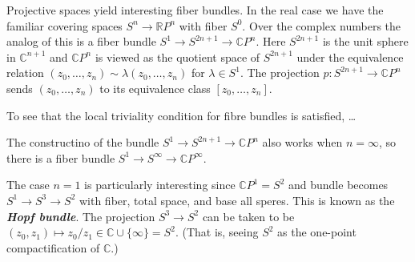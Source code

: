 \documentclass{article}
\newcommand{\C}{\mathbb{C}}
\newcommand{\R}{\mathbb{R}}
\begin{document}
\begin{example}
	Projective spaces yield interesting fiber bundles. In the real case we have the familiar covering spaces $S^n\to\R P^n$ with fiber $S^0$. Over the complex numbers the analog of this is a fiber bundle $S^1\to S^{2n+1}\to\C P^n$. Here $S^{2n+1}$ is the unit sphere in $\C^{n+1}$ and $\C P^n$ is viewed as the quotient space of $S^{2n+1}$ under the equivalence relation $(z_0,\ldots,z_n)\sim\lambda(z_0,\ldots,z_n)$ {\color{orange}for $\lambda\in S^1$}. The projection $p:S^{2n+1}\to\C P^n$ sends $(z_0,\ldots,z_n)$ to its equivalence class $[z_0,\ldots,z_n]$.
	
	To see that the local triviality condition for fibre bundles is satisfied, …
	
	The constructino of the bundle $S^1\to S^{2n+1}\to\C P^n$ also works when $n=\infty$, so there is a fiber bundle $S^1\to S^\infty\to \C P^\infty$.
	
	The case $n=1$ is particularly interesting since $\C P^1=S^2$ and bundle becomes $S^1\to S^3\to S^2$ with fiber, total space, and base all speres. This is known as the \textbf{\textit{Hopf bundle}}. The projection $S^3\to S^2$ can be taken to be $(z_0,z_1)\mapsto z_0/z_1\in\C\cup\{\infty\}=S^2$. {\color{persiangreen}(That is, seeing $S^2$ as the one-point compactification of $\C$.)}
	

\end{example}
\end{document}
